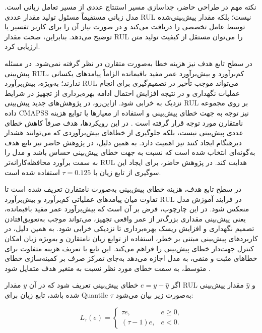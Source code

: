 نکته مهم در طراحی حاضر، جداسازی مسیر استنتاج عددی از مسیر
تعامل زبانی است. مدل زبانی مستقیماً مسئول تولید مقدار عددی
\gls{RUL} نیست؛ بلکه مقدار پیش‌بینی‌شده توسط عامل تخصصی را
دریافت می‌کند و در صورت نیاز آن را برای کاربر تفسیر یا توضیح
می‌دهد. بنابراین، صحت مقدار \gls{RUL} را می‌توان مستقل از کیفیت
تولید متن ارزیابی کرد.

در سطح تابع هدف نیز هزینه خطا به‌صورت متقارن در نظر گرفته
نمی‌شود. در مسئله پیش‌بینی \gls{RUL}، کم‌برآورد و بیش‌برآورد عمر
مفید باقیمانده الزاماً پیامدهای یکسانی ندارند؛ به‌ویژه، بیش‌برآورد
\gls{RUL} می‌تواند موجب تأخیر در تصمیم‌گیری برای انجام عملیات
نگهداری و در نتیجه افزایش احتمال ادامه بهره‌برداری از تجهیز در
شرایط نزدیک به خرابی شود. ازاین‌رو، در پژوهش‌های جدید پیش‌بینی
\gls{RUL} بر روی مجموعه داده \gls{CMAPSS} نیز توجه به جهت خطای
پیش‌بینی و استفاده از معیارها یا توابع هزینه نامتقارن مورد توجه
قرار گرفته است \cite{he2025bilstmgru,zhang2026multistatistic,dong2026bidirectional}. 
در این رویکردها، هدف صرفاً کاهش خطای عددی پیش‌بینی نیست، بلکه
جلوگیری از خطاهای بیش‌برآوردی که می‌توانند هشدار دیرهنگام ایجاد
کنند نیز اهمیت دارد. به همین دلیل، در پژوهش حاضر نیز تابع هدف
به‌گونه‌ای انتخاب شده است که نسبت به جهت خطای پیش‌بینی حساس باشد
و مدل را به سمت برآورد محافظه‌کارانه‌تر \gls{RUL} هدایت کند. در پژوهش حاضر، برای ایجاد
این سوگیری از تابع زیان  با
$\tau=0.125$ استفاده شده است.

در سطح تابع هدف، هزینه خطای پیش‌بینی به‌صورت نامتقارن
تعریف شده است تا تفاوت میان پیامدهای عملیاتی کم‌برآورد و
بیش‌برآورد \gls{RUL} در فرایند آموزش مدل منعکس شود. در این
چارچوب، فرض بر آن است که بیش‌برآورد عمر مفید باقیمانده، یعنی
پیش‌بینی مقداری بزرگ‌تر از عمر واقعی تجهیز، می‌تواند موجب
به‌تعویق‌افتادن تصمیم نگهداری و افزایش ریسک بهره‌برداری تا
نزدیکی خرابی شود. به همین دلیل، در کاربردهای پیش‌بینی مبتنی بر
خطر، استفاده از توابع زیان نامتقارن و به‌ویژه زیان
 امکان کنترل جهت‌دار خطای پیش‌بینی را فراهم
می‌کند. این تابع با تعریف هزینه متفاوت برای خطاهای مثبت و منفی،
به مدل اجازه می‌دهد به‌جای تمرکز صرف بر کمینه‌سازی خطای متوسط،
به سمت خطای مورد نظر نسبت به متغیر هدف متمایل شود
\cite{Robinson2026riskaware}.

اگر $e=y-\hat{y}$ خطای پیش‌بینی تعریف شود که در آن $y$ مقدار
\gls{RUL}
و $\hat{y}$ مقدار پیش‌بینی شده باشد، تابع زیان 
برای
\gls{Quantile}
 $\tau$ به‌صورت زیر بیان می‌شود:

\begin{equation}
	\label{eq:pinball-loss}
	L_{\tau}(e)
	=
	\begin{cases}
		\tau e, & e \geq 0,\\
		(\tau-1)e, & e < 0.
	\end{cases}
\end{equation}

